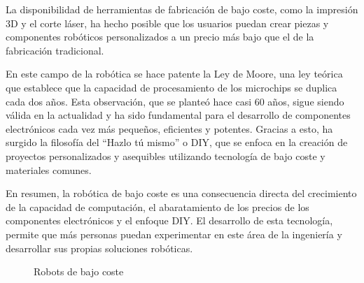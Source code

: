 La disponibilidad de herramientas de fabricación de bajo coste, como la impresión 3D y el corte láser, 
ha hecho posible que los usuarios puedan crear piezas y componentes robóticos personalizados a un 
precio más bajo que el de la fabricación tradicional.

En este campo de la robótica se hace patente la Ley de Moore, una ley teórica 
que establece que la capacidad de procesamiento de los microchips se duplica cada dos años. Esta observación, que 
se planteó hace casi 60 años, sigue siendo válida en la actualidad y ha sido fundamental para el desarrollo de componentes 
electrónicos cada vez más pequeños, eficientes y potentes. Gracias a esto, ha surgido la filosofía del \enquote{Hazlo tú mismo} o \ac{DIY}, que se enfoca en la creación de proyectos personalizados y 
asequibles utilizando tecnología de bajo coste y materiales comunes.

En resumen, la robótica de bajo coste es una consecuencia directa del crecimiento de la capacidad de computación, 
el abaratamiento de los precios de los componentes electrónicos y el enfoque \acs{DIY}.
El desarrollo de esta tecnología, permite que más personas puedan experimentar en este área de la ingeniería y desarrollar 
sus propias soluciones robóticas.
\begin{figure} [ht!]
  \centering    
  \hspace{1cm}
  \caption{Robots de bajo coste}
\end{figure}
\vspace{2cm}


